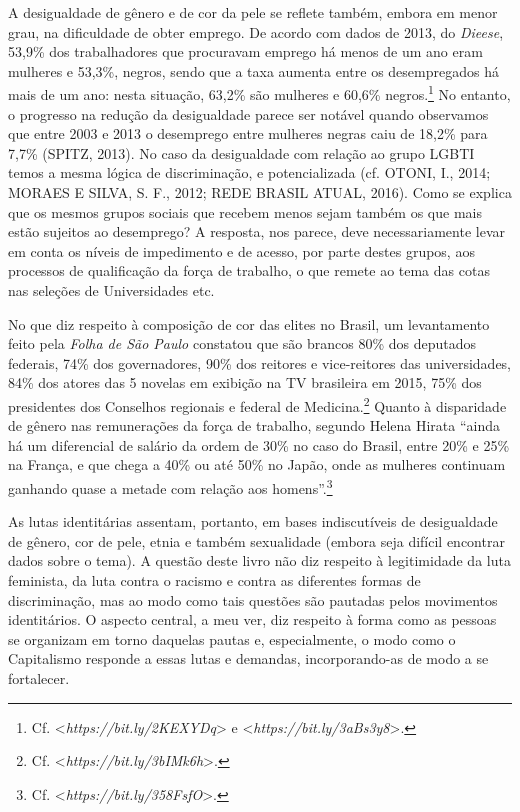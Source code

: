 A desigualdade de gênero e de cor da pele se reflete também, embora em
menor grau, na dificuldade de obter emprego. De acordo com dados de
2013, do \emph{Dieese}, 53,9\% dos trabalhadores que procuravam emprego
há menos de um ano eram mulheres e 53,3\%, negros, sendo que a taxa
aumenta entre os desempregados há mais de um ano: nesta situação, 63,2\%
são mulheres e 60,6\% negros.\footnote{Cf.
  \textless{}\emph{https://bit.ly/2KEXYDq}\textgreater{}
  e
  \textless{}\emph{https://bit.ly/3aBs3y8}\textgreater{}.}
No entanto, o progresso na redução da desigualdade parece ser notável
quando observamos que entre 2003 e 2013 o desemprego entre mulheres
negras caiu de 18,2\% para 7,7\% (SPITZ, 2013). No caso da desigualdade
com relação ao grupo LGBTI temos a mesma lógica de discriminação, e
potencializada (cf. OTONI, I., 2014; MORAES E SILVA, S. F., 2012; REDE
BRASIL ATUAL, 2016). Como se explica que os mesmos grupos sociais que
recebem menos sejam também os que mais estão sujeitos ao desemprego? A
resposta, nos parece, deve necessariamente levar em conta os níveis de
impedimento e de acesso, por parte destes grupos, aos processos de
qualificação da força de trabalho, o que remete ao tema das cotas nas
seleções de Universidades etc.

No que diz respeito à composição de cor das elites no Brasil, um
levantamento feito pela \emph{Folha de São Paulo} constatou que são
brancos 80\% dos deputados federais, 74\% dos governadores, 90\% dos
reitores e vice-reitores das universidades, 84\% dos atores das 5
novelas em exibição na TV brasileira em 2015, 75\% dos presidentes dos
Conselhos regionais e federal de Medicina.\footnote{Cf.
  \textless{}\emph{https://bit.ly/3bIMk6h}\textgreater{}.}
Quanto à disparidade de gênero nas remunerações da força de trabalho,
segundo Helena Hirata ``ainda há um diferencial de salário da ordem de
30\% no caso do Brasil, entre 20\% e 25\% na França, e que chega a 40\%
ou até 50\% no Japão, onde as mulheres continuam ganhando quase a metade
com relação aos homens''.\footnote{Cf.
  \textless{}\emph{https://bit.ly/358FsfO}\textgreater{}.}

As lutas identitárias assentam, portanto, em bases indiscutíveis de
desigualdade de gênero, cor de pele, etnia e também sexualidade (embora
seja difícil encontrar dados sobre o tema). A questão deste livro não
diz respeito à legitimidade da luta feminista, da luta contra o racismo
e contra as diferentes formas de discriminação, mas ao modo como tais
questões são pautadas pelos movimentos identitários. O aspecto central,
a meu ver, diz respeito à forma como as pessoas se organizam em torno
daquelas pautas e, especialmente, o modo como o Capitalismo responde a
essas lutas e demandas, incorporando-as de modo a se fortalecer.

